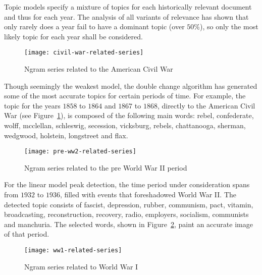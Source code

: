 
Topic models specify a mixture of topics for each historically relevant document and thus for each year. The analysis of all variants of relevance has shown that only rarely does a year fail to have a dominant topic (over $50 \%$), so only the most likely topic for each year shall be considered.

\begin{figure}[t]
\centering
\texttt{[image: civil-war-related-series]}
\caption{Ngram series related to the American Civil War}
\label{fig:civil-war-related-series}
\end{figure}

Though seemingly the weakest model, the double change algorithm has generated some of the most accurate topics for certain periods of time. For example, the topic for the years $1858$ to $1864$ and $1867$ to $1868$,  directly to the American Civil War (see Figure~\ref{fig:civil-war-related-series}), is composed of the following main words: rebel, confederate, wolff, mcclellan, schleswig, secession, vicksburg, rebels, chattanooga, sherman, wedgwood, holstein, longstreet and flax. 

\begin{figure}[t]
\centering
\texttt{[image: pre-ww2-related-series]}
\caption{Ngram series related to the pre World War II period}
\label{fig:pre-ww2-related-series}
\end{figure}

For the linear model peak detection, the time period under consideration spans from $1932$ to $1936$, filled with events that foreshadowed World War II. The detected topic consists of fascist, depression, rubber, communism, pact, vitamin, broadcasting, reconstruction, recovery, radio, employers, socialism, communists and manchuria. The selected words, shown in Figure~\ref{fig:pre-ww2-related-series}, paint an accurate image of that period.

\begin{figure}[t]
\centering
\texttt{[image: ww1-related-series]}
\caption{Ngram series related to World War I}
\label{fig:ww1-related-series}
\end{figure}

